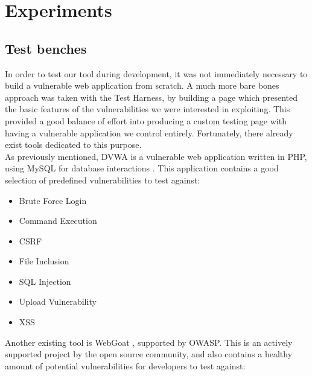 \section{Experiments}


\subsection{Test benches}
In order to test our tool during development, it was not immediately necessary to build a vulnerable web application from scratch. A much more bare bones approach was taken with the Test Harness, by building a page which presented the basic features of the vulnerabilities we were interested in exploiting. This provided a good balance of effort into producing a custom testing page with having a vulnerable application we control entirely.
  Fortunately, there already exist tools dedicated to this purpose. \\

As previously mentioned, DVWA is a vulnerable web application written in PHP, using MySQL for database interactions \cite{dvwaSite}. This application contains a good selection of predefined vulnerabilities to test against:
\begin{multicols}{3}
	\begin{itemize}
		\item Brute Force Login
		\item Command Execution
		\item CSRF
		\item File Inclusion
		\item SQL Injection
		\item Upload Vulnerability
		\item XSS	
	\end{itemize}
\end{multicols}

Another existing tool is WebGoat \cite{webgoatIntro, webgoatGithub}, supported by OWASP. This is an actively supported project by the open source community, and also contains a healthy amount of potential vulnerabilities for developers to test against:


